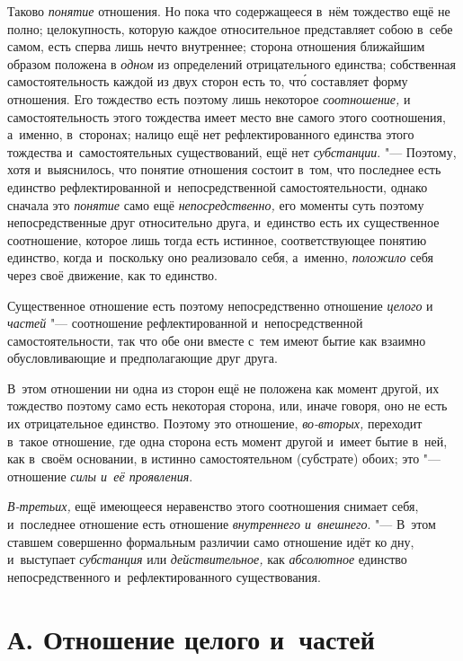 Таково {\em понятие} отношения. Но пока что содержащееся
в~нём тождество ещё не полно; целокупность, которую каждое относительное
представляет собою в~себе самом, есть сперва лишь нечто внутреннее; сторона
отношения ближайшим образом положена в {\em одном} из
определений отрицательного единства; собственная самостоятельность каждой
из двух сторон есть то, чт\'{о} составляет форму отношения. Его тождество есть
поэтому лишь некоторое {\em соотношение,} и
самостоятельность этого тождества имеет место вне самого этого соотношения,
а~именно, в~сторонах; налицо ещё нет рефлектированного единства этого
тождества и~самостоятельных существований, ещё нет
{\em субстанции}. "--- Поэтому, хотя и~выяснилось, что
понятие отношения состоит в~том, что последнее есть единство
рефлектированной и~непосредственной самостоятельности, однако сначала это
{\em понятие} само ещё {\em непосредственно,} его моменты суть поэтому
непосредственные друг относительно друга, и~единство есть их существенное
соотношение, которое лишь тогда есть истинное, соответствующее понятию
единство, когда и~поскольку оно реализовало себя, а~именно,
{\em положило} себя через своё движение, как то единство.

Существенное отношение есть поэтому непосредственно отношение
{\em целого} и {\em частей}
"--- соотношение рефлектированной и~непосредственной самостоятельности, так
что обе они вместе с~тем имеют бытие как взаимно обусловливающие и
предполагающие друг друга.

В~этом отношении ни одна из сторон ещё не положена как момент другой, их
тождество поэтому само есть некоторая сторона, или, иначе говоря, оно не
есть их отрицательное единство. Поэтому это отношение,
{\em во-вторых,} переходит в~такое отношение, где одна
сторона есть момент другой и~имеет бытие в~ней, как в~своём основании, в
истинно самостоятельном (субстрате) обоих; это "--- отношение
{\em силы и~её проявления}.

{\em В-третьих,} ещё имеющееся неравенство этого
соотношения снимает себя, и~последнее отношение есть отношение
{\em внутреннего и~внешнего}. "--- В~этом ставшем
совершенно формальным различии само отношение идёт ко дну, и~выступает
{\em субстанция} или {\em действительное,} как
{\em абсолютное} единство непосредственного и~рефлектированного существования.


\section[А. Отношение целого и~частей]{А. Отношение целого и~частей}

